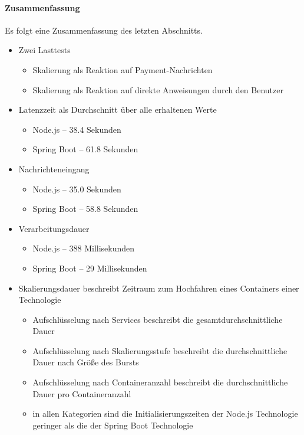 \paragraph{Zusammenfassung}

Es folgt eine Zusammenfassung des letzten Abschnitts.

\begin{itemize}
	\item Zwei Lasttests
	\begin{itemize}
		\item Skalierung als Reaktion auf Payment-Nachrichten
		\item Skalierung als Reaktion auf direkte Anweisungen durch den Benutzer
	\end{itemize}
	\item Latenzzeit als Durchschnitt über alle erhaltenen Werte
	\begin{itemize}
		\item Node.js -- 38.4 Sekunden
		\item Spring Boot -- 61.8 Sekunden
	\end{itemize}
	\item Nachrichteneingang
	\begin{itemize}
		\item Node.js -- 35.0 Sekunden
		\item Spring Boot -- 58.8 Sekunden
	\end{itemize}
	\item Verarbeitungsdauer
	\begin{itemize}
		\item Node.js -- 388 Millisekunden
		\item Spring Boot -- 29 Millisekunden
	\end{itemize}
	\item Skalierungsdauer beschreibt Zeitraum zum Hochfahren eines Containers einer Technologie
	\begin{itemize}
		\item Aufschlüsselung nach Services beschreibt die gesamtdurchschnittliche Dauer
		\item Aufschlüsselung nach Skalierungsstufe beschreibt die durchschnittliche Dauer nach Größe des Bursts
		\item Aufschlüsselung nach Containeranzahl beschreibt die durchschnittliche Dauer pro Containeranzahl
		\item in allen Kategorien sind die Initialisierungszeiten der Node.js Technologie geringer als die der Spring Boot Technologie
	\end{itemize}
\end{itemize}


